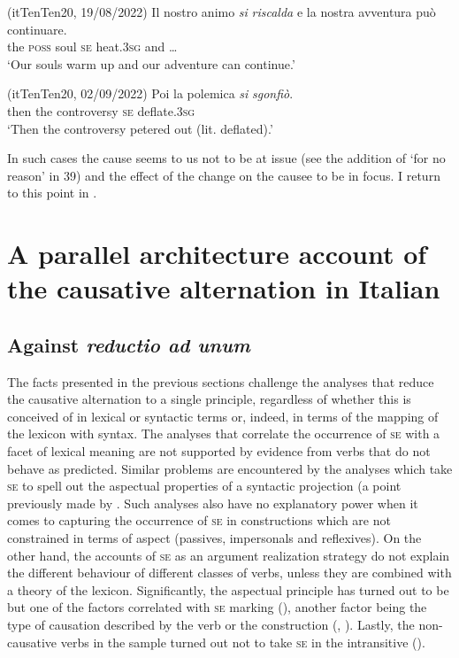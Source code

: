 \documentclass[output=paper,colorlinks,citecolor=brown
]{langscibook}
\begin{document}
\hspace*{\fill}(itTenTen20, 19/08/2022)\quad
\ea \label{bentley_example_41}
    \gll Il		nostro	animo	\textit{si}		\textit{riscalda} e  {la nostra avventura può continuare. } \\
    	the	\textsc{poss}			soul		\textsc{se}		heat.3\textsc{sg}	and			{\ldots} \\
    \glt 					‘Our souls warm up and our adventure can continue.’
\z

\hspace*{\fill}(itTenTen20, 02/09/2022)\quad
\ea \label{bentley_example_42}
    \gll Poi 	la		polemica				\textit{si}		\textit{sgonfiò}. \\
    			then	the	controversy	\textsc{se}		deflate.3\textsc{sg}	 \\
    \glt ‘Then the controversy petered out (lit. deflated).’
\z


In such cases the cause seems to us not to be at issue (see the addition of ‘for no reason’ in 39) and the effect of the change on the causee to be in focus. I return to this point in .

\section{A parallel architecture account of the causative alternation in Italian}
\label{bentley_section_5}

\subsection{Against \textit{reductio ad unum}}
\label{bentley_section_5.1}

The facts presented in the previous sections challenge the analyses that reduce the causative alternation to a single principle, regardless of whether this is conceived of in lexical or syntactic terms or, indeed, in terms of the mapping of the lexicon with syntax. The analyses that correlate the occurrence of \textsc{se} with a facet of lexical meaning are not supported by evidence from verbs that do not behave as predicted. Similar problems are encountered by the analyses which take \textsc{se} to spell out the aspectual properties of a syntactic projection (a point previously made by \citet[82—88]{alexiadou2015external}. Such analyses also have no explanatory power when it comes to capturing the occurrence of \textsc{se} in constructions which are not constrained in terms of aspect (passives, impersonals and reflexives). On the other hand, the accounts of \textsc{se} as an argument realization strategy do not explain the different behaviour of different classes of verbs, unless they are combined with a theory of the lexicon. Significantly, the aspectual principle has turned out to be but one of the factors correlated with \textsc{se} marking (), another factor being the type of causation described by the verb or the construction (, ). Lastly, the non-causative verbs in the sample turned out not to take \textsc{se} in the intransitive (). 
\end{document}
